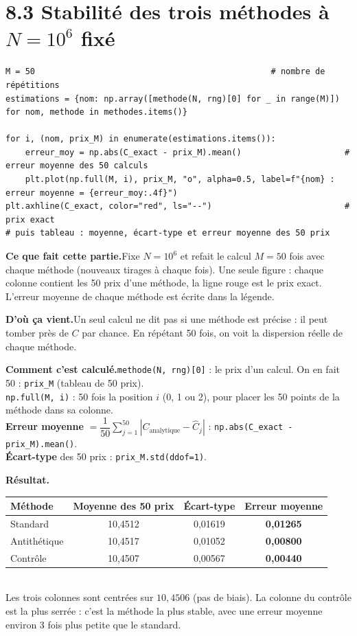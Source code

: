 \documentclass[11pt,a4paper]{article}
\newcommand{\quoi}[1]{\par\noindent\textbf{\color{bleu}Ce que fait cette partie.}\enspace #1\par}
\newcommand{\source}[1]{\par\noindent\textbf{\color{orange}D'où ça vient.}\enspace #1\par}
\newcommand{\calcul}[1]{\par\noindent\textbf{\color{bleu}Comment c'est calculé.}\enspace #1\par}
\newcommand{\resultat}[1]{\par\noindent\textbf{\color{vert}Résultat.}\enspace #1\par}
\newcommand{\sect}[1]{\clearpage\section{#1}}
\begin{document}
\sect{8.3 Stabilité des trois méthodes à $N = 10^6$ fixé}
\begin{lstlisting}
M = 50                                                # nombre de répétitions
estimations = {nom: np.array([methode(N, rng)[0] for _ in range(M)]) for nom, methode in methodes.items()}

for i, (nom, prix_M) in enumerate(estimations.items()):
    erreur_moy = np.abs(C_exact - prix_M).mean()                     # erreur moyenne des 50 calculs
    plt.plot(np.full(M, i), prix_M, "o", alpha=0.5, label=f"{nom} : erreur moyenne = {erreur_moy:.4f}")
plt.axhline(C_exact, color="red", ls="--")                           # prix exact
# puis tableau : moyenne, écart-type et erreur moyenne des 50 prix
\end{lstlisting}
\quoi{Fixe $N = 10^6$ et refait le calcul $M = 50$ fois avec chaque méthode (nouveaux tirages à chaque fois). Une seule figure : chaque colonne contient les 50 prix d'une méthode, la ligne rouge est le prix exact. L'erreur moyenne de chaque méthode est écrite dans la légende.}
\source{Un seul calcul ne dit pas si une méthode est précise : il peut tomber près de $C$ par chance. En répétant 50 fois, on voit la dispersion réelle de chaque méthode.}
\calcul{\texttt{methode(N, rng)[0]} : le prix d'un calcul. On en fait 50 : \texttt{prix\_M} (tableau de 50 prix).\\
\texttt{np.full(M, i)} : 50 fois la position $i$ (0, 1 ou 2), pour placer les 50 points de la méthode dans sa colonne.\\
\textbf{Erreur moyenne} $= \dfrac{1}{50}\sum_{j=1}^{50} |C_{\text{analytique}} - \hat C_j|$ : \texttt{np.abs(C\_exact - prix\_M).mean()}.\\
\textbf{Écart-type} des 50 prix : \texttt{prix\_M.std(ddof=1)}.}
\resultat{\small
\begin{tabular}{lccc}
\toprule
Méthode & Moyenne des 50 prix & Écart-type & \textbf{Erreur moyenne} \\
\midrule
Standard & 10,4512 & 0,01619 & \textbf{0,01265} \\
Antithétique & 10,4517 & 0,01052 & \textbf{0,00800} \\
Contrôle & 10,4507 & 0,00567 & \textbf{0,00440} \\
\bottomrule
\end{tabular}\\[4pt]
Les trois colonnes sont centrées sur $10{,}4506$ (pas de biais). La colonne du contrôle est la plus serrée : c'est la méthode la plus stable, avec une erreur moyenne environ 3 fois plus petite que le standard.}
\end{document}
